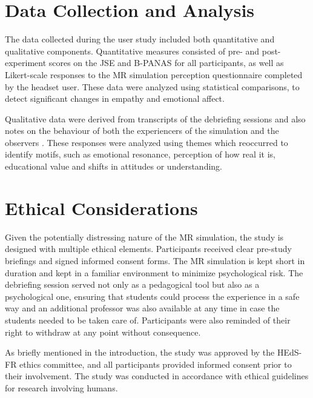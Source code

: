 \section{Data Collection and Analysis}

The data collected during the user study included both quantitative and qualitative components. Quantitative measures consisted of pre- and post-experiment scores on the JSE and B-PANAS for all participants, as well as Likert-scale responses to the MR simulation perception questionnaire completed by the headset user. These data were analyzed using statistical comparisons, to detect significant changes in empathy and emotional affect. 

\vspace{1em}

Qualitative data were derived from transcripts of the debriefing sessions and also notes on the behaviour of both the experiencers of the simulation and the observers . These responses were analyzed using themes which reoccurred to identify motifs, such as emotional resonance, perception of how real it is, educational value and shifts in attitudes or understanding.

\section{Ethical Considerations}

Given the potentially distressing nature of the MR simulation, the study is designed with multiple ethical elements. Participants received clear pre-study briefings and signed informed consent forms. The MR simulation is kept short in duration and kept in a familiar environment to minimize psychological risk. The debriefing session served not only as a pedagogical tool but also as a psychological one, ensuring that students could process the experience in a safe way and an additional professor was also available at any time in case the students needed to be taken care of. Participants were also reminded of their right to withdraw at any point without consequence.

As briefly mentioned in the introduction, the study was approved by the HEdS-FR ethics committee, and all participants provided informed consent prior to their involvement. The study was conducted in accordance with ethical guidelines for research involving humans.
